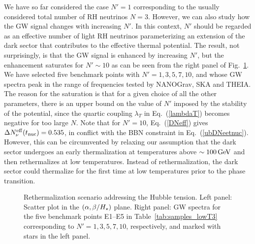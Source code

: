 \documentclass[a4paper,11pt]{article}
\begin{document}
We have so far considered the case $N' = 1$ corresponding to the usually considered total number of RH neutrinos $N=3$. However, we can also study how the GW signal  changes with increasing $N'$. In this context, $N'$ should be regarded as an effective number
of light RH neutrinos parameterizing an extension of the dark sector that contributes to the effective thermal potential.
The result, not surprisingly, is that the GW signal is enhanced by increasing $N'$, but the enhancement saturates for $N' \sim 10$
as can be seen from the right panel of Fig.~\ref{f6}. We have selected five benchmark points with $N'= 1,3,5,7, 10$, and whose GW spectra peak in the range of frequencies
tested by NANOGrav, SKA and THEIA. The reason for the saturation is that for a given choice of all the other parameters, there is 
an upper bound on the value of $N'$ imposed by the stability of the potential, since the quartic coupling $\lambda_T$ in Eq.~(\ref{lambdaT}) 
becomes negative for too large $N$. Note that for $N' = 10$, Eq.~(\ref{DNeff}) gives
$\Delta N_{\nu}^{\rm eff}(t_{\rm nuc}) = 0.535$, in conflict with the BBN constraint in Eq.~(\ref{ubDNeetnuc}).
However, this can be circumvented by relaxing our assumption that
the dark sector undergoes an early thermalization at temperatures above $\sim 100\,{\rm GeV}$ 
and then rethermalizes at low temperatures. Instead of rethermalization, the dark sector could thermalize for the
first time at low temperatures prior to the phase transition. 
\begin{figure}
\begin{center}
\hspace{2mm}
\end{center}
\caption{Rethermalization scenario addressing the Hubble tension.  Left panel: Scatter plot in the $(\alpha, \beta/H_\star)$ plane.  
 Right panel: GW spectra for the five benchmark points E1--E5 in Table~\ref{tab:samples_lowT3} corresponding to $N' =1 ,3, 5, 7, 10$, respectively, and marked with stars in the left panel. }
\label{f6}
\end{figure}
\end{document}

